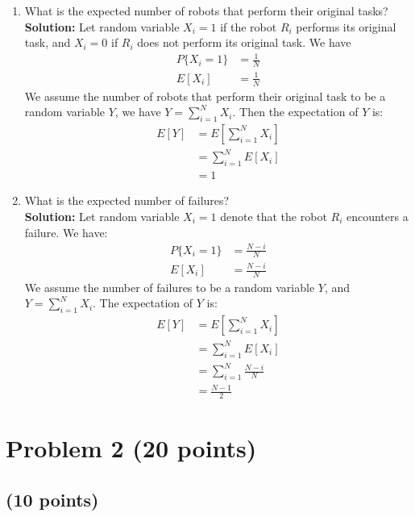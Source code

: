 \documentclass[letterpaper, 11pt]{article}
\begin{document}
\begin{enumerate}
\item What is the expected number of robots that perform their original tasks?\\
\textbf{Solution:} Let random variable $X_i=1$ if the robot $R_i$ performs its original task, and $X_i=0$ if $R_i$ does not perform its original task. We have 
\begin{align}
    P\{X_i=1\}&=\frac{1}{N}\\
    E[X_i]&=\frac{1}{N}
\end{align}
We assume the number of robots that perform their original task to be a random variable $Y$, we have $Y = \sum_{i=1}^{N}X_i$. Then the expectation of $Y$ is:
\begin{align}
    E[Y] &= E[\sum_{i=1}^{N}X_i]\\
    &=\sum_{i=1}^{N}E[X_i]\\
    &=1
\end{align}

\item What is the expected number of failures?\\
\textbf{Solution:} Let random variable $X_i=1$ denote that the robot $R_i$ encounters a failure. We have:\\
\begin{align}
    P\{X_i=1\}&=\frac{N-i}{N}\\
    E[X_i]&=\frac{N-i}{N}
\end{align}
We assume the number of failures to be a random variable $Y$, and $Y=\sum_{i=1}^{N}X_i$. The expectation of $Y$ is:
\begin{align}
    E[Y] &= E[\sum_{i=1}^{N}X_i]\\
    &=\sum_{i=1}^{N}E[X_i]\\
    &=\sum_{i=1}^{N}\frac{N-i}{N}\\
    &=\frac{N-1}{2}
\end{align}

\end{enumerate}



\section{Problem 2 (20 points)}

\subsection{(10 points)}
\end{document}
